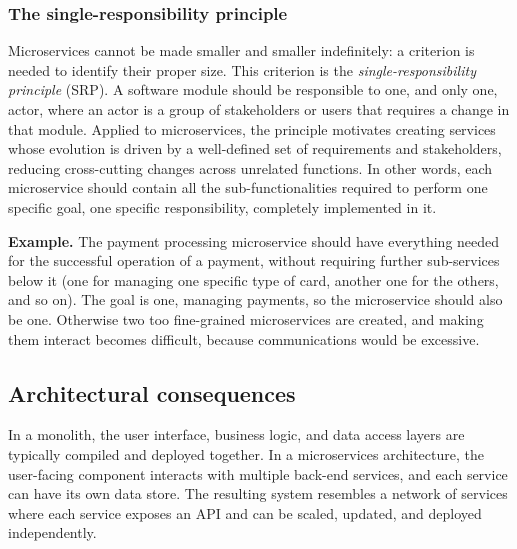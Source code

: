 \subsubsection*{The single-responsibility principle}

Microservices cannot be made smaller and smaller indefinitely: a criterion is needed to identify their proper size. This criterion is the \emph{single-responsibility principle} (SRP). A software module should be responsible to one, and only one, actor, where an actor is a group of stakeholders or users that requires a change in that module. Applied to microservices, the principle motivates creating services whose evolution is driven by a well-defined set of requirements and stakeholders, reducing cross-cutting changes across unrelated functions. In other words, each microservice should contain all the sub-functionalities required to perform one specific goal, one specific responsibility, completely implemented in it.

\begin{notebox}
	\textbf{Example.} The payment processing microservice should have everything needed for the successful operation of a payment, without requiring further sub-services below it (one for managing one specific type of card, another one for the others, and so on). The goal is one, managing payments, so the microservice should also be one. Otherwise two too fine-grained microservices are created, and making them interact becomes difficult, because communications would be excessive.
\end{notebox}

\subsection{Architectural consequences}

In a monolith, the user interface, business logic, and data access layers are typically compiled and deployed together. In a microservices architecture, the user-facing component interacts with multiple back-end services, and each service can have its own data store. The resulting system resembles a network of services where each service exposes an API and can be scaled, updated, and deployed independently.

\begin{center}
\end{center}

